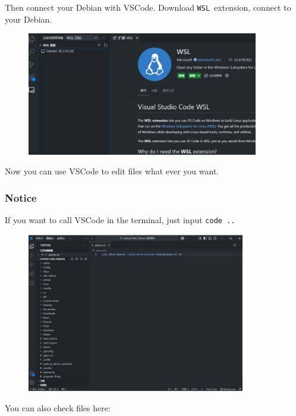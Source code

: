 \documentclass[12pt]{ctexart}
\begin{document}
Then connect your Debian with VSCode. Download \texttt{WSL}\ extension,
connect to your Debian.

\begin{figure}[H]
    \centering
    \includegraphics[width=0.9\textwidth,keepaspectratio]{assets/Linux/1.1 How to install Debian on Windows/5.png}
\end{figure}

Now you can use VSCode to edit files what ever you want.

\subsubsection*{\textbf{Notice}}

If you want to call VSCode in the terminal, just input \texttt{code\ ..}

\begin{figure}[H]
    \centering
    \includegraphics[width=0.85\textwidth,keepaspectratio]{assets/Linux/1.1 How to install Debian on Windows/6.png}
\end{figure}

You can also check files here:
\end{document}
